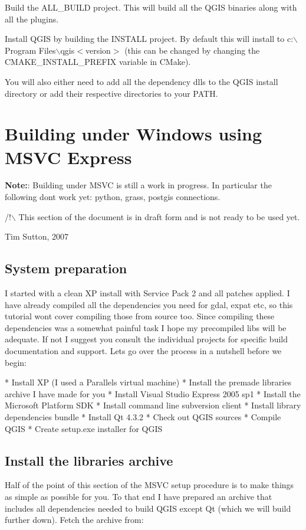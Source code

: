 Build the ALL\_BUILD project. This will build all the QGIS binaries along with all the plugins.

 Install QGIS by building the INSTALL project. By default this will install to c:$\backslash$Program Files$\backslash$qgis$<$version$>$ (this can be changed by changing the CMAKE\_INSTALL\_PREFIX variable in CMake). 

 You will also either need to add all the dependency dlls to the QGIS install directory or add their respective directories to your PATH.

\section{Building under Windows using MSVC Express}
\textbf{Note:}: Building under MSVC is still a work in progress. In particular the following dont work yet: python, grass, postgis connections.

/!$\backslash$ This section of the document is in draft form and is not ready to be used yet.

Tim Sutton, 2007

\subsection{System preparation}
I started with a clean XP install with Service Pack 2 and all patches applied.
I have already compiled all the dependencies you need for gdal, expat etc,
so this tutorial wont cover compiling those from source too. Since compiling 
these dependencies was a somewhat painful task I hope my precompiled libs 
will be adequate. If not I suggest you consult the individual projects for
specific build documentation and support. Lets go over the process in a nutshell 
before we begin:

 * Install XP (I used a Parallels virtual machine)
 * Install the premade libraries archive I have made for you
 * Install Visual Studio Express 2005 sp1
 * Install the Microsoft Platform SDK
 * Install command line subversion client
 * Install library dependencies bundle
 * Install Qt 4.3.2
 * Check out QGIS sources
 * Compile QGIS
 * Create setup.exe installer for QGIS

\subsection{Install the libraries archive}
Half of the point of this section of the MSVC setup procedure is to make 
things as simple as possible for you. To that end I have prepared an
archive that includes all dependencies needed to build QGIS except Qt 
(which we will build further down). Fetch the archive from:

